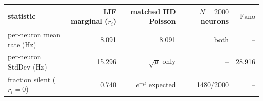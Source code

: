 \begin{tabular}{lrrrr}
\toprule
statistic & LIF marginal ($r_i$) & matched IID Poisson & $N=2000$ neurons & $\mathrm{Fano}$ \\
\midrule
per-neuron mean rate (Hz) & 8.091 & 8.091 & both & -- \\
per-neuron StdDev (Hz) & 15.296 & $\sqrt{\mu}$ only & -- & 28.916 \\
fraction silent ($r_i=0$) & 0.740 & $e^{-\mu}$ expected & 1480/2000 & -- \\
\bottomrule
\end{tabular}
